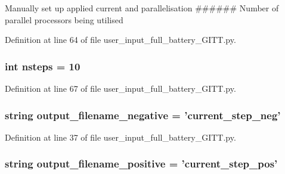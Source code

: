 Manually set up applied current and parallelisation \#\#\#\#\#\# Number of parallel processors being utilised 

Definition at line 64 of file user\-\_\-input\-\_\-full\-\_\-battery\-\_\-\-G\-I\-T\-T.\-py.

\hypertarget{namespaceuser__input__full__battery___g_i_t_t_aa2414080b021dbb9b56eeaeedec0ffa2}{
\subsubsection[{nsteps}]{\setlength{\rightskip}{0pt plus 5cm}int nsteps = 10}}\label{namespaceuser__input__full__battery___g_i_t_t_aa2414080b021dbb9b56eeaeedec0ffa2}


Definition at line 67 of file user\-\_\-input\-\_\-full\-\_\-battery\-\_\-\-G\-I\-T\-T.\-py.

\hypertarget{namespaceuser__input__full__battery___g_i_t_t_a701d8142cb069e7737cab8445986caa3}{
\subsubsection[{output\-\_\-filename\-\_\-negative}]{\setlength{\rightskip}{0pt plus 5cm}string output\-\_\-filename\-\_\-negative = 'current\-\_\-step\-\_\-neg'}}\label{namespaceuser__input__full__battery___g_i_t_t_a701d8142cb069e7737cab8445986caa3}


Definition at line 37 of file user\-\_\-input\-\_\-full\-\_\-battery\-\_\-\-G\-I\-T\-T.\-py.

\hypertarget{namespaceuser__input__full__battery___g_i_t_t_aa07a082ed078c3321f15b79529277837}{
\subsubsection[{output\-\_\-filename\-\_\-positive}]{\setlength{\rightskip}{0pt plus 5cm}string output\-\_\-filename\-\_\-positive = 'current\-\_\-step\-\_\-pos'}}\label{namespaceuser__input__full__battery___g_i_t_t_aa07a082ed078c3321f15b79529277837}


